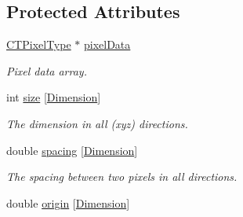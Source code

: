 \subsection*{Protected Attributes}
\begin{DoxyCompactItemize}
\item 
\hypertarget{classctimage_1_1_c_t_image_af6d5d0c3991568e121f0543ebaad348c}{
\hyperlink{classctimage_1_1_c_t_image_ab3bf32a276d168a705973d8d6c698cec}{CTPixelType} $\ast$ \hyperlink{classctimage_1_1_c_t_image_af6d5d0c3991568e121f0543ebaad348c}{pixelData}}
\label{classctimage_1_1_c_t_image_af6d5d0c3991568e121f0543ebaad348c}

\begin{DoxyCompactList}\small\item\em Pixel data array. \item\end{DoxyCompactList}\item 
\hypertarget{classctimage_1_1_c_t_image_aab436b15c45aff941a30ebbf3d9ccd7f}{
int \hyperlink{classctimage_1_1_c_t_image_aab436b15c45aff941a30ebbf3d9ccd7f}{size} \mbox{[}\hyperlink{classctimage_1_1_c_t_image_ad28aaad081539a4a2e7f1cc38c06aa3a}{Dimension}\mbox{]}}
\label{classctimage_1_1_c_t_image_aab436b15c45aff941a30ebbf3d9ccd7f}

\begin{DoxyCompactList}\small\item\em The dimension in all (xyz) directions. \item\end{DoxyCompactList}\item 
\hypertarget{classctimage_1_1_c_t_image_ab9a73f002d0cb09bf5a5212f9d64d98f}{
double \hyperlink{classctimage_1_1_c_t_image_ab9a73f002d0cb09bf5a5212f9d64d98f}{spacing} \mbox{[}\hyperlink{classctimage_1_1_c_t_image_ad28aaad081539a4a2e7f1cc38c06aa3a}{Dimension}\mbox{]}}
\label{classctimage_1_1_c_t_image_ab9a73f002d0cb09bf5a5212f9d64d98f}

\begin{DoxyCompactList}\small\item\em The spacing between two pixels in all directions. \item\end{DoxyCompactList}\item 
\hypertarget{classctimage_1_1_c_t_image_ac021e29ecd42262c6a9db72b8b97ce13}{
double \hyperlink{classctimage_1_1_c_t_image_ac021e29ecd42262c6a9db72b8b97ce13}{origin} \mbox{[}\hyperlink{classctimage_1_1_c_t_image_ad28aaad081539a4a2e7f1cc38c06aa3a}{Dimension}\mbox{]}}
\label{classctimage_1_1_c_t_image_ac021e29ecd42262c6a9db72b8b97ce13}


\end{DoxyCompactItemize}
